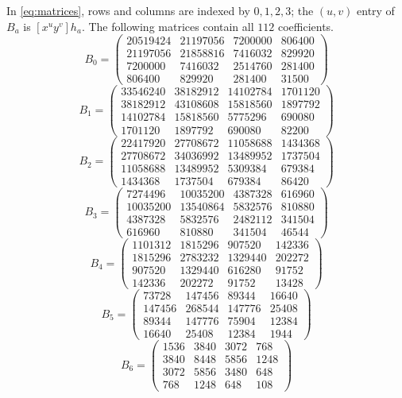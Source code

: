\documentclass[11pt]{article}
\begin{document}
In \eqref{eq:matrices}, rows and columns are indexed by $0,1,2,3$;
the $(u,v)$ entry of $B_a$ is $[x^uy^v]h_a$.
The following matrices contain all $112$ coefficients.
\small
\[
B_0=\left(\begin{array}{cccc}
20519424 & 21197056 & 7200000 & 806400 \\
21197056 & 21858816 & 7416032 & 829920 \\
7200000 & 7416032 & 2514760 & 281400 \\
806400 & 829920 & 281400 & 31500
\end{array}\right)
\]
\[
B_1=\left(\begin{array}{cccc}
33546240 & 38182912 & 14102784 & 1701120 \\
38182912 & 43108608 & 15818560 & 1897792 \\
14102784 & 15818560 & 5775296 & 690080 \\
1701120 & 1897792 & 690080 & 82200
\end{array}\right)
\]
\[
B_2=\left(\begin{array}{cccc}
22417920 & 27708672 & 11058688 & 1434368 \\
27708672 & 34036992 & 13489952 & 1737504 \\
11058688 & 13489952 & 5309384 & 679384 \\
1434368 & 1737504 & 679384 & 86420
\end{array}\right)
\]
\[
B_3=\left(\begin{array}{cccc}
7274496 & 10035200 & 4387328 & 616960 \\
10035200 & 13540864 & 5832576 & 810880 \\
4387328 & 5832576 & 2482112 & 341504 \\
616960 & 810880 & 341504 & 46544
\end{array}\right)
\]
\[
B_4=\left(\begin{array}{cccc}
1101312 & 1815296 & 907520 & 142336 \\
1815296 & 2783232 & 1329440 & 202272 \\
907520 & 1329440 & 616280 & 91752 \\
142336 & 202272 & 91752 & 13428
\end{array}\right)
\]
\[
B_5=\left(\begin{array}{cccc}
73728 & 147456 & 89344 & 16640 \\
147456 & 268544 & 147776 & 25408 \\
89344 & 147776 & 75904 & 12384 \\
16640 & 25408 & 12384 & 1944
\end{array}\right)
\]
\[
B_6=\left(\begin{array}{cccc}
1536 & 3840 & 3072 & 768 \\
3840 & 8448 & 5856 & 1248 \\
3072 & 5856 & 3480 & 648 \\
768 & 1248 & 648 & 108
\end{array}\right)
\]
\normalsize
\end{document}
